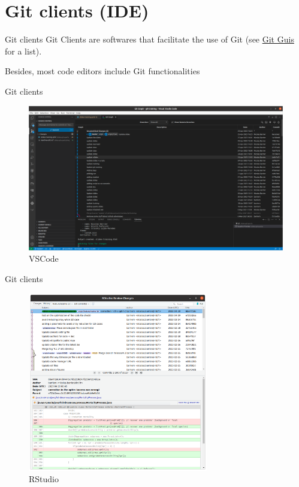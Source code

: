 \documentclass[10pt]{beamer}
\begin{document}
\section{Git clients (IDE)}

\begin{frame}{Git clients}
\protect\hypertarget{git-clients}{}
Git Clients are softwares that facilitate the use of Git (see
\href{https://git-scm.com/downloads/guis}{Git Guis} for a list).

Besides, most code editors include Git functionalities
\end{frame}

\begin{frame}{Git clients}
\protect\hypertarget{git-clients-1}{}
\begin{figure}

{\centering \includegraphics[width=\textwidth]{img/vscode.png}

}

\caption{\label{fig-vscode}VSCode}

\end{figure}
\end{frame}

\begin{frame}{Git clients}
\protect\hypertarget{git-clients-2}{}
\begin{figure}

{\centering \includegraphics[width=0.7\textwidth]{img/rstudio.png}

}

\caption{\label{fig-rstudio}RStudio}

\end{figure}
\end{frame}
\end{document}
